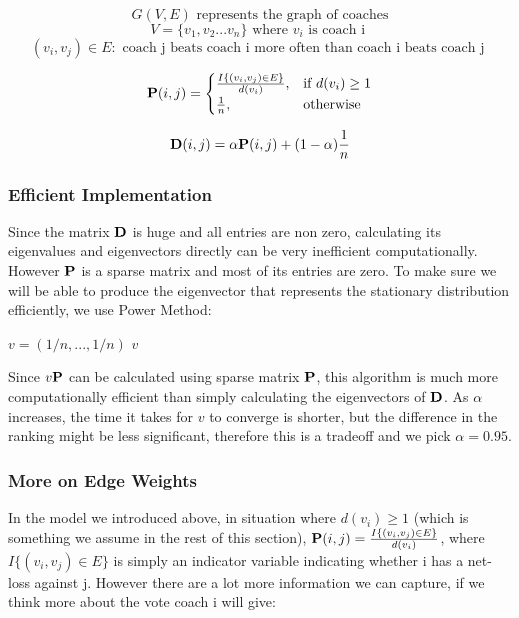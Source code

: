 \documentclass[titlepage]{article}
\begin{document}
$$G(V, E) \mbox{ represents the graph of coaches}$$
$$V = \{v_1, v_2 ... v_n\} \mbox{ where } v_i \mbox{ is coach i }$$
$$(v_i, v_j) \in E : \mbox{ coach j beats coach i more often than coach i beats coach j }$$



\[
    {\bf P} (i, j)= 
\begin{cases}
    \frac{ I\{(v_i, v_j) \in E\}}{d(v_i)},& \text{if } d(v_i) \geq 1\\
    \frac{1}{n},              & \text{otherwise}
\end{cases}
\]

$${\bf D} (i, j) = \alpha {\bf P} (i, j)  + (1-\alpha)\frac{1}{n}$$


\subsubsection*{Efficient Implementation}

Since the matrix ${\bf D}$ is huge and all entries are non zero, calculating its eigenvalues and eigenvectors directly can be very inefficient computationally. However ${\bf P}$ is a sparse matrix and most of its entries are zero. To make sure we will be able to produce the eigenvector that represents the stationary distribution efficiently, we use Power Method:

\vspace{5mm}

\begin{algorithm}[H]

$v = (1/n, ... ,1/n)$\;
\Return $v$\;
\end{algorithm}

\vspace{5mm}

\noindent Since $v {\bf P}$ can be calculated using sparse matrix ${\bf P}$, this algorithm is much more computationally efficient than simply calculating the eigenvectors of ${\bf D}$. As $\alpha$ increases, the time it takes for $v$ to converge is shorter, but the difference in the ranking might be less significant, therefore this is a tradeoff and we pick $\alpha = 0.95$.

\subsubsection*{More on Edge Weights}

\noindent In the model we introduced above, in situation where $d(v_i) \geq 1$ (which is something we assume in the rest of this section), ${\bf P}(i, j) = \frac{ I\{(v_i, v_j) \in E\}}{d(v_i)}$, where $I\{(v_i, v_j) \in E\}$ is simply an indicator variable indicating whether i has a net-loss against j. However there are a lot more information we can capture, if we think more about the vote coach i will give:
\end{document}
